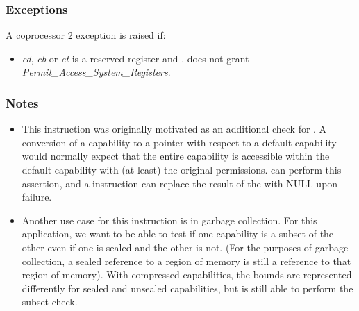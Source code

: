 \subsubsection*{Exceptions}

A coprocessor 2 exception is raised if:

\begin{itemize}
\item
\emph{cd}, \emph{cb} or \emph{ct} is a reserved register and \PCC.\cperms{} does
not grant \emph{Permit\_Access\_System\_Registers}.
\end{itemize}

\subsubsection*{Notes}

\begin{itemize}
\item
This instruction was originally motivated as an additional check for
.
A conversion of a capability to a pointer with respect to a default capability
would normally expect that the entire capability is accessible within the
default capability with (at least) the original permissions.
 can perform this assertion, and a 
instruction can replace the result of the  with NULL upon
failure.
\item
Another use case for this instruction is in garbage collection. For this
application, we want to be able to test if one capability is a subset of
the other even if one is sealed and the other is not. (For the purposes of
garbage collection, a sealed reference to a region of memory is still a
reference to that region of memory). With compressed capabilities, the bounds
are represented differently for sealed and unsealed capabilities, but
 is still able to perform the subset check.
\end{itemize}
